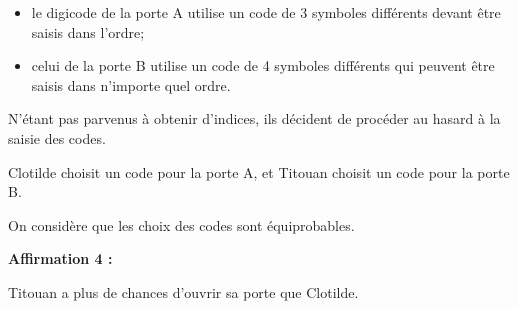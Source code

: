 \documentclass[10pt]{article}
\begin{document}
\begin{enumerate}[itemsep=1cm]
		\begin{itemize}[label={\textbullet~}]
			\item le digicode de la porte A utilise un code de 3 symboles différents devant être saisis dans l'ordre;
			\item celui de la porte B utilise un code de 4 symboles différents qui peuvent être saisis dans n'importe quel ordre.
		\end{itemize}

		N'étant pas parvenus à obtenir d'indices, ils décident de procéder au hasard à la saisie des codes.

		Clotilde choisit un code pour la porte A, et Titouan choisit un code pour la porte B.

		On considère que les choix des codes sont équiprobables.

		\textbf{Affirmation 4 :}

		Titouan a plus de chances d'ouvrir sa porte que Clotilde.
	\end{enumerate}
\end{document}
